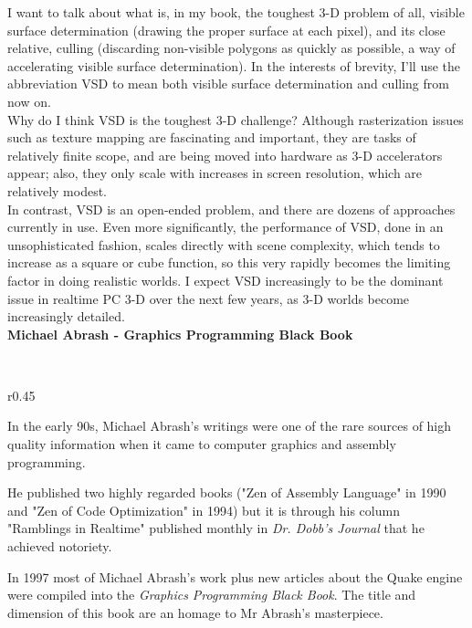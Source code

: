 \begin{fancyquotes}
I want to talk about what is, in my book, the toughest 3-D problem of all, visible surface determination (drawing the proper surface at each pixel), and its close relative, culling (discarding non-visible polygons as quickly as possible, a way of accelerating visible surface determination). In the interests of brevity, I'll use the abbreviation VSD to mean both visible surface determination and culling from now on.
 \bigskip \\
Why do I think VSD is the toughest 3-D challenge? Although rasterization issues such as texture mapping are fascinating and important, they are tasks of relatively finite scope, and are being moved into hardware as 3-D accelerators appear; also, they only scale with increases in screen resolution, which are relatively modest.
 \bigskip \\
In contrast, VSD is an open-ended problem, and there are dozens of approaches currently in use. Even more significantly, the performance of VSD, done in an unsophisticated fashion, scales directly with scene complexity, which tends to increase as a square or cube function, so this very rapidly becomes the limiting factor in doing realistic worlds. I expect VSD increasingly to be the dominant issue in realtime PC 3-D over the next few years, as 3-D worlds become increasingly detailed.
 \bigskip \\
\textbf{Michael Abrash - Graphics Programming Black Book}
 \end{fancyquotes}\\
\par
\begin{wrapfigure}[17]{r}{0.45\textwidth} 
\vspace{-10pt}
\end{wrapfigure} 
 In the early 90s, Michael Abrash's writings were one of the rare sources of high quality information when it came to computer graphics and assembly programming.\\
\par
He published two highly regarded books ("Zen of Assembly Language" in 1990 and "Zen of Code Optimization" in 1994) but it is through his column "Ramblings in Realtime" published monthly in \textit{Dr. Dobb's Journal} that he achieved notoriety.
 \\
\par
 In 1997 most of Michael Abrash's work plus new articles about the Quake engine were compiled into the \textit{Graphics Programming Black Book}. The title and dimension of this book are an homage to Mr Abrash's masterpiece.





